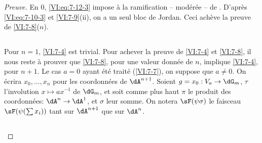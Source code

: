 \begin{proof}[Preuve]
En $0$, \eqref{VI:eq:7-12-3} impose à la ramification -- modérée -- de 
. D'après 
\eqref{VI:eq:7-10-3} et \ref{VI:7-9}(ii), on a un seul bloc de Jordan. Ceci 
achève la preuve de \ref{VI:7-8}($n$). 





\subsection{}\label{VI:7-13}

Pour $n=1$, \ref{VI:7-4} est trivial. Pour achever la preuve de \ref{VI:7-4} et 
\ref{VI:7-8}, il nous reste à prouver que \ref{VI:7-8}, pour une valeur 
donnée de $n$, implique \ref{VI:7-4}, pour $n+1$. Le cas $a=0$ ayant été 
traité (\ref{VI:7-7}), on suppose que $a\ne 0$. On écrira $x_0,\dots,x_n$ pour 
les coordonnées de $\dA^{n+1}$. Soient $g=x_0:V_a\to \dG_m$, $\tau$ 
l'involution $x\mapsto a x^{-1}$ de $\dG_m$, et soit comme plus haut $\pi$ le 
produit des coordonnées: $\dA^n \to \dA^1$, et $\sigma$ leur somme. On 
notera $\sF(\psi\sigma)$ le faisceau $\sF(\psi(\sum x_i))$ tant sur $\dA^{n+1}$ 
que sur $\dA^n$. 





\subsection{}\label{VI:7-14}


\end{proof}
